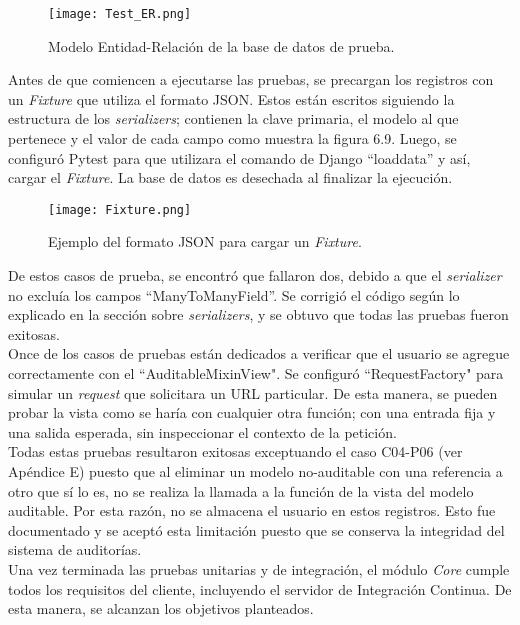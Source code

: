 \begin{figure}[h]
\centering
\texttt{[image: Test\_ER.png]}
\caption{Modelo Entidad-Relación de la base de datos de prueba.}
\label{fig:figura6.8}
\end{figure}


Antes de que comiencen a ejecutarse las pruebas, se precargan los registros con un \textit{Fixture} que utiliza el formato JSON.  Estos están escritos siguiendo la estructura de los \textit{serializers}; contienen la clave primaria, el modelo al que pertenece y el valor de cada campo como muestra la figura 6.9. Luego, se configuró Pytest para que utilizara el comando de Django “loaddata” y así, cargar el \textit{Fixture}. La base de datos es desechada al finalizar la ejecución.

\begin{figure}[h]
\centering
\texttt{[image: Fixture.png]}
\caption{Ejemplo del formato JSON para cargar un \textit{Fixture}.}
\label{fig:figura6.9}
\end{figure}

De estos casos de prueba, se encontró que fallaron dos, debido a que el \textit{serializer} no excluía los campos “ManyToManyField”. Se corrigió el código según lo explicado en la sección sobre \textit{serializers}, y se obtuvo que todas las pruebas fueron exitosas.\\

Once de los casos de pruebas están dedicados a verificar que el usuario se agregue correctamente con el “AuditableMixinView". Se configuró “RequestFactory" para simular un \textit{request} que solicitara un URL particular. De esta manera, se pueden probar la vista como se haría con cualquier otra función; con una entrada fija y una salida esperada, sin inspeccionar el contexto de la petición.\\

Todas estas pruebas resultaron exitosas exceptuando el caso C04-P06 (ver Apéndice E) puesto que al eliminar un modelo no-auditable con una referencia a otro que sí lo es, no se realiza la llamada a la función de la vista del modelo auditable. Por esta razón, no se almacena el usuario en estos registros. Esto fue documentado y se aceptó esta limitación puesto que se conserva la integridad del sistema de auditorías.\\

Una vez terminada las pruebas unitarias y de integración, el módulo \textit{Core} cumple todos los requisitos del cliente, incluyendo el servidor de Integración Continua. De esta manera, se alcanzan los objetivos planteados.

